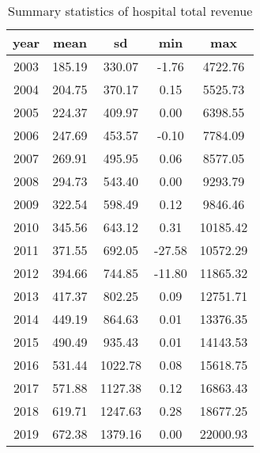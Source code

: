 \begin{table}[ht]
\centering
\begin{tabular}{ccccc}
  \hline
year & mean & sd & min & max \\ 
  \hline
2003 & 185.19 & 330.07 & -1.76 & 4722.76 \\ 
  2004 & 204.75 & 370.17 & 0.15 & 5525.73 \\ 
  2005 & 224.37 & 409.97 & 0.00 & 6398.55 \\ 
  2006 & 247.69 & 453.57 & -0.10 & 7784.09 \\ 
  2007 & 269.91 & 495.95 & 0.06 & 8577.05 \\ 
  2008 & 294.73 & 543.40 & 0.00 & 9293.79 \\ 
  2009 & 322.54 & 598.49 & 0.12 & 9846.46 \\ 
  2010 & 345.56 & 643.12 & 0.31 & 10185.42 \\ 
  2011 & 371.55 & 692.05 & -27.58 & 10572.29 \\ 
  2012 & 394.66 & 744.85 & -11.80 & 11865.32 \\ 
  2013 & 417.37 & 802.25 & 0.09 & 12751.71 \\ 
  2014 & 449.19 & 864.63 & 0.01 & 13376.35 \\ 
  2015 & 490.49 & 935.43 & 0.01 & 14143.53 \\ 
  2016 & 531.44 & 1022.78 & 0.08 & 15618.75 \\ 
  2017 & 571.88 & 1127.38 & 0.12 & 16863.43 \\ 
  2018 & 619.71 & 1247.63 & 0.28 & 18677.25 \\ 
  2019 & 672.38 & 1379.16 & 0.00 & 22000.93 \\ 
   \hline
\end{tabular}
\caption{Summary statistics of hospital total revenue} 
\end{table}
